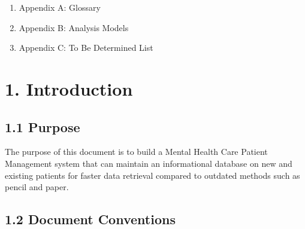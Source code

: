 \documentclass[12pt]{article}
\renewcommand{\_}{\kern-1.5pt\textunderscore\kern-1.5pt}
\begin{document}
\begin{enumerate}
	\item {\fontsize{13pt}{15.6pt}\selectfont Appendix A: Glossary\par}\par

	\item {\fontsize{13pt}{15.6pt}\selectfont Appendix B: Analysis Models\par}\par

	\item {\fontsize{13pt}{15.6pt}\selectfont Appendix C: To Be Determined List\par}
\end{enumerate}\par

\newpage

\section*{1. \hspace*{10pt}Introduction}
\setlength{\parskip}{3.96pt}
\subsection*{1.1 \hspace*{10pt}Purpose}
\tab The purpose of this document is to build a Mental Health Care Patient Management system that can maintain an informational database on new and existing patients for faster data retrieval compared to outdated methods such as pencil and paper. \par

\subsection*{1.2 \hspace*{10pt}Document Conventions}

\vspace{\baselineskip}
\end{document}
